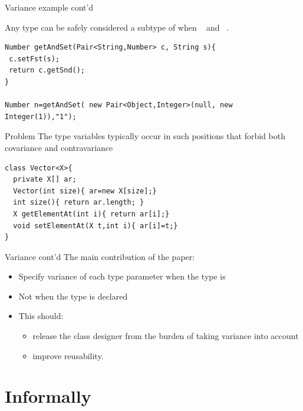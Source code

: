 \documentclass[usenames,dvipsnames]{beamer}
\begin{document}
\begin{frame}[fragile]{Variance example cont'd}

Any type  can be safely considered a subtype of  when  \supt\  and  \subt\ .

\vspace{1cm}

\begin{lstlisting}[language=JastAdd]
Number getAndSet(Pair<String,Number> c, String s){
 c.setFst(s);
 return c.getSnd();
}

Number n=getAndSet( new Pair<Object,Integer>(null, new Integer(1)),"1");
\end{lstlisting}


\end{frame}

\begin{frame}[fragile]{Problem}
The type variables typically occur in such positions that forbid both covariance and contravariance
\begin{lstlisting}[language=JastAdd]
class Vector<X>{
  private X[] ar;
  Vector(int size){ ar=new X[size];}
  int size(){ return ar.length; }
  X getElementAt(int i){ return ar[i];}
  void setElementAt(X t,int i){ ar[i]=t;}
}
\end{lstlisting}
\end{frame}

	\begin{frame}[fragile]{Variance cont'd}
The main contribution of the paper:
		\begin{itemize}
			\item Specify variance of each type parameter when the type is 
			\item Not when the type is \alert{declared}
			\item This should:
			\begin{itemize}
				\item release the class designer from the burden of taking variance into account
				\item improve reusability.
			\end{itemize}
		\end{itemize}
	\end{frame}
\section{Informally}
\end{document}
